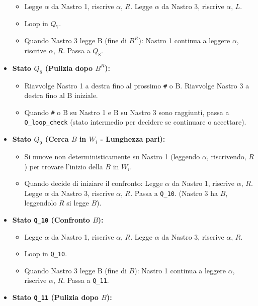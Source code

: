 \documentclass[a4paper]{article}
\newcommand{\B}{\text{B}} %
\begin{document}
\begin{itemize}
\begin{itemize}
            \item Legge $\alpha$ da Nastro 1, riscrive $\alpha$, $R$. Legge $\alpha$ da Nastro 3, riscrive $\alpha$, $L$.
            \item Loop in $Q_7$.
            \item Quando Nastro 3 legge $\B$ (fine di $B^R$): Nastro 1 continua a leggere $\alpha$, riscrive $\alpha$, $R$. Passa a $Q_8$.
        \end{itemize}
    \item \textbf{Stato $Q_8$ (Pulizia dopo $B^R$):}
        \begin{itemize}
            \item Riavvolge Nastro 1 a destra fino al prossimo \texttt{\#} o $\B$. Riavvolge Nastro 3 a destra fino al $\B$ iniziale.
            \item Quando \texttt{\#} o $\B$ su Nastro 1 e $\B$ su Nastro 3 sono raggiunti, passa a \texttt{Q\_{loop\_check}} (stato intermedio per decidere se continuare o accettare).
        \end{itemize}
    \item \textbf{Stato $Q_9$ (Cerca $B$ in $W_i$ - Lunghezza pari):}
        \begin{itemize}
            \item Si muove non deterministicamente su Nastro 1 (leggendo $\alpha$, riscrivendo, $R$) per trovare l'inizio della $B$ in $W_i$.
            \item Quando decide di iniziare il confronto: Legge $\alpha$ da Nastro 1, riscrive $\alpha$, $R$. Legge $\alpha$ da Nastro 3, riscrive $\alpha$, $R$. Passa a \texttt{Q\_{10}}.
            (Nastro 3 ha $B$, leggendolo $R$ si legge $B$).
        \end{itemize}
    \item \textbf{Stato \texttt{Q\_{10}} (Confronto $B$):}
        \begin{itemize}
            \item Legge $\alpha$ da Nastro 1, riscrive $\alpha$, $R$. Legge $\alpha$ da Nastro 3, riscrive $\alpha$, $R$.
            \item Loop in \texttt{Q\_{10}}.
            \item Quando Nastro 3 legge $\B$ (fine di $B$): Nastro 1 continua a leggere $\alpha$, riscrive $\alpha$, $R$. Passa a \texttt{Q\_{11}}.
        \end{itemize}
    \item \textbf{Stato \texttt{Q\_{11}} (Pulizia dopo $B$):}
        \begin{itemize}

\end{itemize}
\end{itemize}
\end{document}
